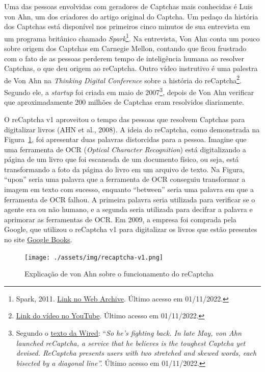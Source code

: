 \documentclass[12pt,twoside,brazilian]{book}
\begin{document}
Uma das pessoas envolvidas com geradores de Captchas mais conhecidas é
Luis von Ahn, um dos criadores do artigo original do Captcha. Um pedaço
da história dos Captchas está disponível nos primeiros cinco minutos de
sua entrevista em um programa britânico chamado \emph{Spark}\footnote{Spark,
  2011.
  \href{https://web.archive.org/web/20120603142110/http://www.cbc.ca/spark/2011/11/full-interview-luis-von-ahn-on-duolingo/}{Link
  no Web Archive}. Último acesso em 01/11/2022.}. Na entrevista, Von Ahn
conta um pouco sobre origem dos Captchas em Carnegie Mellon, contando
que ficou frustrado com o fato de as pessoas perderem tempo de
inteligência humana ao resolver Captchas, o que deu origem ao reCaptcha.
Outro vídeo instrutivo é uma palestra de Von Ahn na \emph{Thinking
Digital Conference} sobre a história do reCaptcha\footnote{\href{https://www.youtube.com/watch?v=i_5ew4btJiQ}{Link
  do vídeo no YouTube}. Último acesso em 01/11/2022.}. Segundo ele, a
\emph{startup} foi criada em maio de 2007\footnote{Segundo o
  \href{https://www.wired.com/2007/06/ff-humancomp/}{texto da Wired}:
  ``\emph{So he's fighting back. In late May, von Ahn launched
  reCaptcha, a service that he believes is the toughest Captcha yet
  devised. ReCaptcha presents users with two stretched and skewed words,
  each bisected by a diagonal line''.} Último acesso em 01/11/2022.},
depois de Von Ahn verificar que aproximadamente 200 milhões de Captchas
eram resolvidos diariamente.

O reCaptcha v1 aproveitou o tempo das pessoas que resolvem Captchas para
digitalizar livros (AHN et al., 2008). A ideia do reCaptcha, como
demonstrada na Figura~\ref{fig-recaptcha-v1}, foi apresentar duas
palavras distorcidas para a pessoa. Imagine que uma ferramenta de OCR
(\emph{Optical Character Recognition}) está digitalizando a página de um
livro que foi escaneada de um documento físico, ou seja, está
transformando a foto da página do livro em um arquivo de texto. Na
Figura, ``upon'' seria uma palavra que a ferramenta de OCR conseguiu
transformar a imagem em texto com sucesso, enquanto ``between'' seria
uma palavra em que a ferramenta de OCR falhou. A primeira palavra seria
utilizada para verificar se o agente era ou não humano, e a segunda
seria utilizada para decifrar a palavra e aprimorar as ferramentas de
OCR. Em 2009, a empresa foi comprada pela Google, que utilizou o
reCaptcha v1 para digitalizar os livros que estão presentes no site
\href{https://books.google.com.br/}{Google Books}.

\begin{figure}

{\centering \texttt{[image: ./assets/img/recaptcha-v1.png]}

}

\caption{\label{fig-recaptcha-v1}Explicação de von Ahn sobre o
funcionamento do reCaptcha}

\end{figure}
\end{document}

